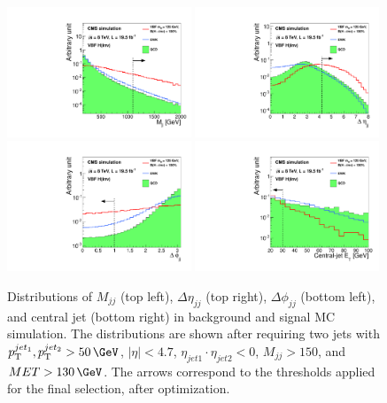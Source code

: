 \begin{figure}[!htb]
\centering
\includegraphics[width=0.49\textwidth]{Chapter05/Images/VBF-Dijet-M.pdf}
\includegraphics[width=0.49\textwidth]{Chapter05/Images/VBF-Dijet-DEta.pdf}     
\includegraphics[width=0.49\textwidth]{Chapter05/Images/VBF-Dijet-DPhi.pdf}
\includegraphics[width=0.49\textwidth]{Chapter05/Images/VBF-CJV-pT.pdf} 
\caption{Distributions of $M_{jj}$ (top left), $\Delta\eta_{jj}$ (top right), $\Delta\phi_{jj}$ (bottom left), and central jet \pt (bottom right) in background and signal MC simulation. The distributions are shown after requiring two jets with $\pt^{jet_1},\pt^{jet_2} > 50\,\GeV$, $|\eta| < 4.7$, $\eta_{jet1} \cdot \eta_{jet2} < 0$, $M_{jj}>150$\GeV, and $MET > 130\,\GeV$. The arrows correspond to the thresholds applied for the final selection, after optimization. \cite{ARTICLE:CMSVBFHiggsToInvAndZHCombination}}
\label{fig:vbfSel}
\end{figure}

